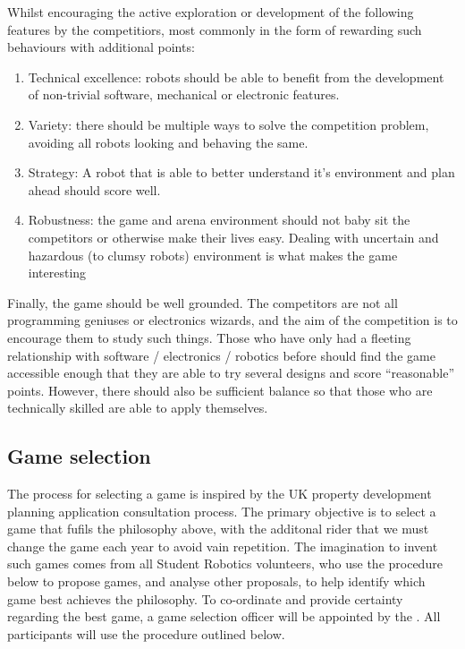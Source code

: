 Whilst encouraging the active exploration or development of the following
features by the competitiors, most commonly in the form of rewarding such
behaviours with additional points:
\begin{enumerate}
	\item Technical excellence: robots should be able to benefit from the development of non-trivial software, mechanical or electronic features.
	\item Variety: there should be multiple ways to solve the competition
		problem, avoiding all robots looking and behaving the same.
	\item Strategy: A robot that is able to better understand it's
		environment and plan ahead should score well.
	\item Robustness: the game and arena environment should not baby sit
		the competitors or otherwise make their lives easy. Dealing with
		uncertain and hazardous (to clumsy robots) environment is what
		makes the game interesting
\end{enumerate}

Finally, the game should be well grounded. The competitors are not all
programming geniuses or electronics wizards, and the aim of the competition is
to encourage them to study such things. Those who have only had a fleeting
relationship with software / electronics / robotics before should find the game
accessible enough that they are able to try several designs and score
``reasonable'' points. However, there should also be sufficient balance so that
those who are technically skilled are able to apply themselves.

\subsection{Game selection}

The process for selecting a game is inspired by the UK property development
planning application consultation process. The primary objective is to select
a game that fufils the philosophy above, with the additonal rider that we must
change the game each year to avoid vain repetition. The imagination to invent
such games comes from all Student Robotics volunteers, who use the procedure
below to propose games, and analyse other proposals, to help identify which
game best achieves the philosophy. To co-ordinate and provide certainty
regarding the best game, a game selection officer will be appointed by the
. All participants will use the procedure outlined
below.

